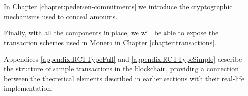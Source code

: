 In Chapter \ref{chapter:pedersen-commitments} we introduce the cryptographic mechanisms used to conceal amounts.

Finally, with all the components in place, we will be able to expose the transaction schemes used in Monero in Chapter \ref{chapter:transactions}.




Appendices \ref{appendix:RCTTypeFull} and \ref{appendix:RCTTypeSimple} describe the structure of sample transactions in the blockchain, providing a connection between the theoretical elements described in earlier sections with their real-life implementation.